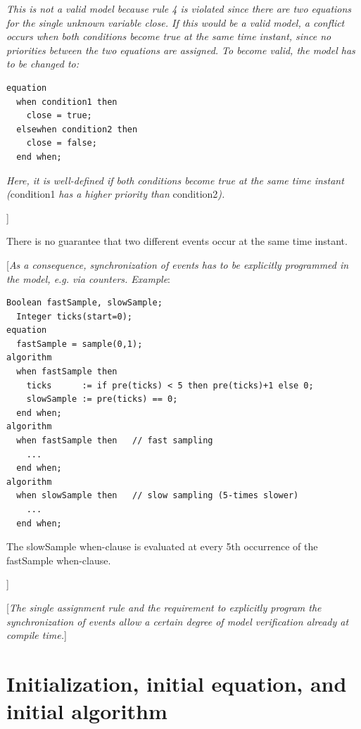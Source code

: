 \documentclass[10pt,a4paper]{report}
\def\doublelabel#1{\label{#1}\hypertarget{#1}{}}
\begin{document}
\emph{This is not a valid model because rule 4 is violated since there
are two equations for the single unknown variable close. If this would
be a valid model, a conflict occurs when both conditions become true at
the same time instant, since no priorities between the two equations are
assigned. To become valid, the model has to be changed to:}

\begin{lstlisting}[language=modelica]
equation
  when condition1 then
    close = true;
  elsewhen condition2 then
    close = false;
  end when; 
\end{lstlisting}

\emph{Here, it is well-defined if both conditions become true at the
same time instant (}condition1 \emph{has a higher priority than}
condition2\emph{).}

{]}

There is no guarantee that two different events occur at the same time
instant.

{[}\emph{As a consequence, synchronization of events has to be
explicitly programmed in the model, e.g. via counters. Example}:

\begin{lstlisting}[language=modelica]
  Boolean fastSample, slowSample;
  Integer ticks(start=0);
equation
  fastSample = sample(0,1);
algorithm
  when fastSample then
    ticks      := if pre(ticks) < 5 then pre(ticks)+1 else 0;
	slowSample := pre(ticks) == 0;
  end when; 
algorithm
  when fastSample then   // fast sampling     
    ...   
  end when; 
algorithm   
  when slowSample then   // slow sampling (5-times slower)
    ...   
  end when;
\end{lstlisting}

The slowSample when-clause is evaluated at every 5th occurrence of the
fastSample when-clause.

{]}

{[}\emph{The single assignment rule and the requirement to explicitly
program the synchronization of events allow a certain degree of model
verification already at compile time.}{]}

\section{Initialization, initial equation, and initial algorithm}\doublelabel{initialization-initial-equation-and-initial-algorithm}
\end{document}

